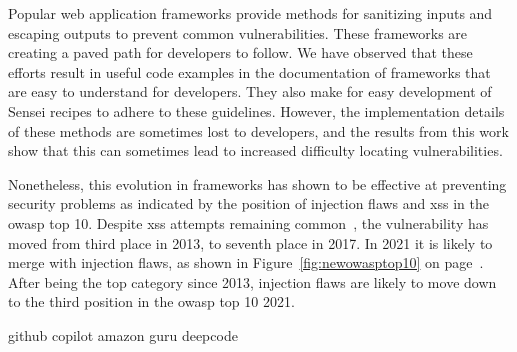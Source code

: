 Popular web application frameworks provide methods for sanitizing inputs and escaping outputs to prevent common vulnerabilities.
These frameworks are creating a paved path for developers to follow.
We have observed that these efforts result in useful code examples in the documentation of frameworks that are easy to understand for developers.
They also make for easy development of Sensei recipes to adhere to these guidelines.
However, the implementation details of these methods are sometimes lost to developers, and the results from this work show that this can sometimes lead to increased difficulty locating vulnerabilities.

Nonetheless, this evolution in frameworks has shown to be effective at preventing security problems as indicated by the position of injection flaws and \gls{xss} in the \gls{owasp} top 10.
Despite \gls{xss} attempts remaining common~\cite{trustwave}, the vulnerability has moved from third place in 2013, to seventh place in 2017.
In 2021 it is likely to merge with injection flaws, as shown in Figure~\ref{fig:newowasptop10} on page~\pageref{fig:newowasptop10}.
After being the top category since 2013, injection flaws are likely to move down to the third position in the \gls{owasp} top 10 2021.




github copilot
amazon guru
deepcode